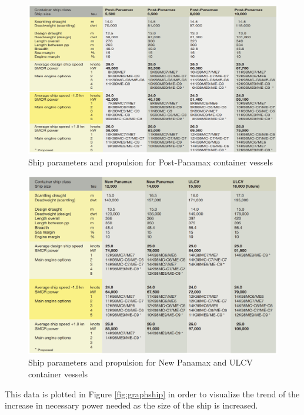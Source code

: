 \documentclass[12pt]{article}
\begin{document}
\begin{figure}[H]                                  
    \centering                                     
    \includegraphics[width=\textwidth]{PropulsionPostPanamax}
    \caption{Ship parameters and propulsion for Post-Panamax container vessels \cite{propul}}     
    \label{fig:2ship}     
\end{figure}

\begin{figure}[H]                                  
    \centering                                     
    \includegraphics[width=\textwidth]{PropulsionULCV}   
    \caption{Ship parameters and propulsion for New Panamax and ULCV container vessels \cite{propul}}
    \label{fig:3ship}     
\end{figure}

This data is plotted in Figure \ref{fig:graphship} in order to visualize the trend of the increase in necessary power needed as the size of the ship is increased.
\end{document}
